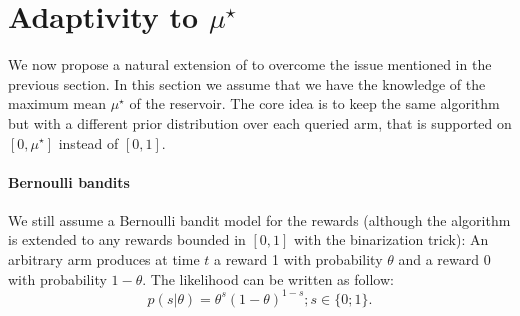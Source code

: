 \section{Adaptivity to \texorpdfstring{$\mu^\star$}{}}\label{app:dttts.adapt}

We now propose a natural extension of \DTTTS to overcome the issue mentioned in the previous section. In this section we assume that we have the knowledge of the maximum mean $\mu^\star$ of the reservoir. The core idea is to keep the same algorithm but with a different prior distribution over each queried arm, that is supported on $[0, \mu^\star]$ instead of $[0, 1]$.

\paragraph{Bernoulli bandits}
We still assume a Bernoulli bandit model for the rewards (although the algorithm is extended to any rewards bounded in $[0,1]$ with the binarization trick): An arbitrary arm produces at time $t$ a reward 1 with probability $\theta$ and a reward 0 with probability $1-\theta$. The likelihood can be written as follow:
\[
    p(s|\theta) = \theta^s(1-\theta)^{1-s}; s\in\{0;1\}.
\]


